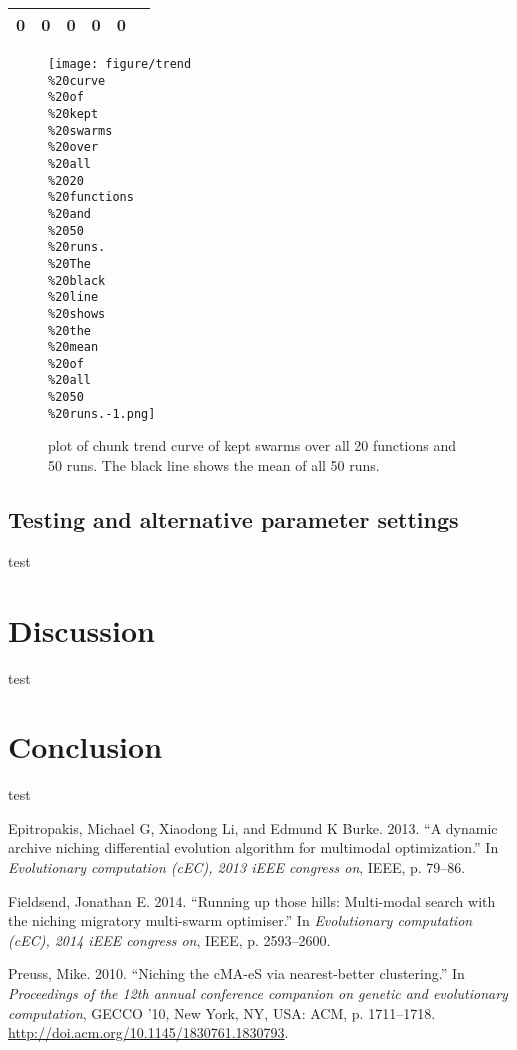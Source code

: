 \documentclass[12pt,a4paper]{article}
\begin{document}
\begin{longtable}[c]{@{}cccccc@{}}
\begin{minipage}[t]{0.07\columnwidth}
0
\strut\end{minipage} &
\begin{minipage}[t]{0.08\columnwidth}\centering\strut
0
\strut\end{minipage} &
\begin{minipage}[t]{0.09\columnwidth}\centering\strut
0
\strut\end{minipage} &
\begin{minipage}[t]{0.10\columnwidth}\centering\strut
0
\strut\end{minipage} &
\begin{minipage}[t]{0.10\columnwidth}\centering\strut
0
\strut\end{minipage}\tabularnewline
\bottomrule
\end{longtable}

\begin{figure}[htbp]
\centering
\texttt{[image: figure/trend\\\%20curve\\\%20of\\\%20kept\\\%20swarms\\\%20over\\\%20all\\\%2020\\\%20functions\\\%20and\\\%2050\\\%20runs.\\\%20The\\\%20black\\\%20line\\\%20shows\\\%20the\\\%20mean\\\%20of\\\%20all\\\%2050\\\%20runs.-1.png]}
\caption{plot of chunk trend curve of kept swarms over all 20 functions
and 50 runs. The black line shows the mean of all 50 runs.}
\end{figure}

\subsection{Testing and alternative parameter
settings}\label{testing-and-alternative-parameter-settings}

test

\section{Discussion}\label{discussion}

test

\section{Conclusion}\label{conclusion}

test \newpage

\hypertarget{refs}{}
\hypertarget{ref-epitropakisux5f2013}{}
Epitropakis, Michael G, Xiaodong Li, and Edmund K Burke. 2013. ``A
dynamic archive niching differential evolution algorithm for multimodal
optimization.'' In \emph{Evolutionary computation (cEC), 2013 iEEE
congress on}, IEEE, p. 79--86.

\hypertarget{ref-fieldsendux5f2014}{}
Fieldsend, Jonathan E. 2014. ``Running up those hills: Multi-modal
search with the niching migratory multi-swarm optimiser.'' In
\emph{Evolutionary computation (cEC), 2014 iEEE congress on}, IEEE, p.
2593--2600.

\hypertarget{ref-preussux5f2010}{}
Preuss, Mike. 2010. ``Niching the cMA-eS via nearest-better
clustering.'' In \emph{Proceedings of the 12th annual conference
companion on genetic and evolutionary computation}, GECCO '10, New York,
NY, USA: ACM, p. 1711--1718.
\url{http://doi.acm.org/10.1145/1830761.1830793}.
\end{document}
